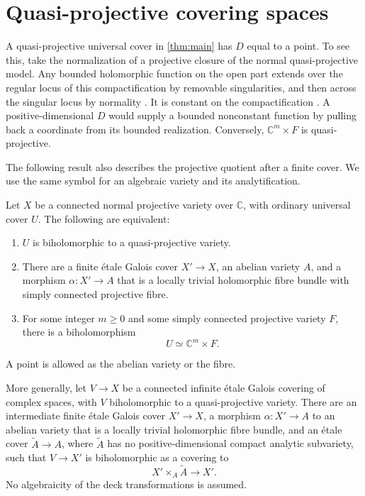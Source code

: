 \section{Quasi-projective covering spaces}\label{sec:quasiprojective}

A quasi-projective universal cover in \cref{thm:main} has $D$ equal to a point. To see this, take the normalization of a projective closure of the normal quasi-projective model. Any bounded holomorphic function on the open part extends over the regular locus of this compactification by removable singularities, and then across the singular locus by normality \cite[Chapter~II, Remark~4.2 and Definition~7.4]{DemaillyCADG}. It is constant on the compactification \cite[Corollary~II.5.8]{DemaillyCADG}. A positive-dimensional $D$ would supply a bounded nonconstant function by pulling back a coordinate from its bounded realization. Conversely, $\mathbb{C}^m\times F$ is quasi-projective.

The following result also describes the projective quotient after a finite cover. We use the same symbol for an algebraic variety and its analytification.

\begin{corollary}\label{cor:quasiprojective}
Let $X$ be a connected normal projective variety over $\mathbb{C}$, with ordinary universal cover $U$. The following are equivalent:
\begin{enumerate}[label=\textup{(\roman*)}]
\item $U$ is biholomorphic to a quasi-projective variety.
\item There are a finite \'etale Galois cover $X'\to X$, an abelian
variety $A$, and a morphism $\alpha:X'\to A$ that is a locally trivial holomorphic fibre bundle with simply connected projective fibre.
\item For some integer $m\geq0$ and some simply connected projective
variety $F$, there is a biholomorphism
\[
                         U\simeq\mathbb{C}^m\times F.
\]
\end{enumerate}
A point is allowed as the abelian variety or the fibre.

More generally, let $V\to X$ be a connected infinite \'etale Galois covering of complex spaces, with $V$ biholomorphic to a quasi-projective variety. There are an intermediate finite \'etale Galois cover $X'\to X$, a morphism $\alpha:X'\to A$ to an abelian variety that is a locally trivial holomorphic fibre bundle, and an \'etale cover $\widetilde A\to A$, where $\widetilde A$ has no positive-dimensional compact analytic subvariety, such that $V\to X'$ is biholomorphic as a covering to
\[
                    X'\times_A\widetilde A\longrightarrow X'.
\]
No algebraicity of the deck transformations is assumed.
\end{corollary}

